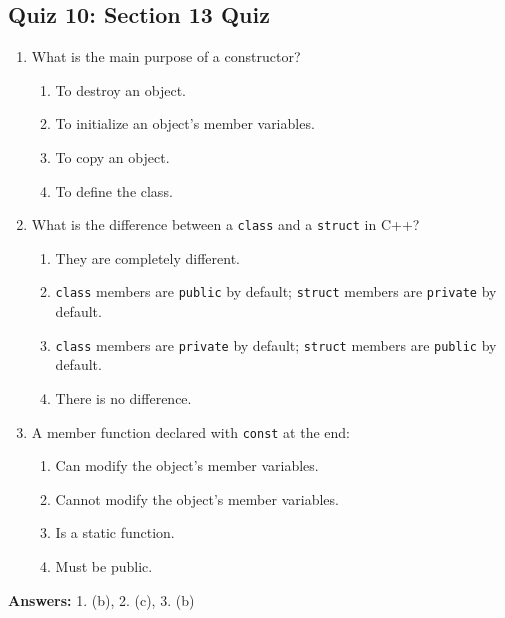 \subsection{Quiz 10: Section 13 Quiz}
\begin{enumerate}
	\item What is the main purpose of a constructor?
	\begin{enumerate}
		\item[a)] To destroy an object.
		\item[b)] To initialize an object's member variables.
		\item[c)] To copy an object.
		\item[d)] To define the class.
	\end{enumerate}

	\item What is the difference between a \texttt{class} and a \texttt{struct} in C++?
	\begin{enumerate}
		\item[a)] They are completely different.
		\item[b)] \texttt{class} members are \texttt{public} by default; \texttt{struct} members are \texttt{private} by default.
		\item[c)] \texttt{class} members are \texttt{private} by default; \texttt{struct} members are \texttt{public} by default.
		\item[d)] There is no difference.
	\end{enumerate}

	\item A member function declared with \texttt{const} at the end:
	\begin{enumerate}
		\item[a)] Can modify the object's member variables.
		\item[b)] Cannot modify the object's member variables.
		\item[c)] Is a static function.
		\item[d)] Must be public.
	\end{enumerate}
\end{enumerate}

\textbf{Answers:} 1. (b), 2. (c), 3. (b)
